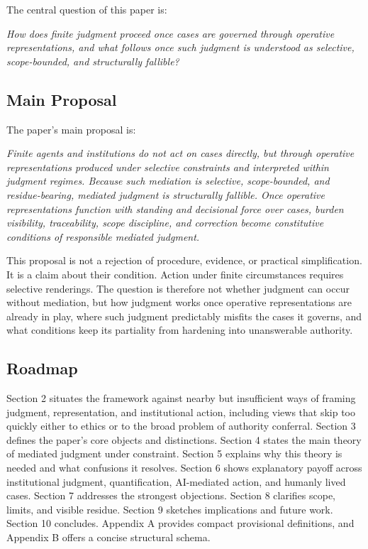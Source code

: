\documentclass[11pt]{article}
\renewenvironment{quote}
  {\list{}{\leftmargin=1.4em \rightmargin=1.0em}%
   \item\relax\color{softink}\itshape}
  {\endlist}
\begin{document}
The central question of this paper is:

\begin{quote}
How does finite judgment proceed once cases are governed through operative representations, and what follows once such judgment is understood as selective, scope-bounded, and structurally fallible?
\end{quote}

\subsection{Main Proposal}

The paper's main proposal is:

\begin{quote}
Finite agents and institutions do not act on cases directly, but through operative representations produced under selective constraints and interpreted within judgment regimes. Because such mediation is selective, scope-bounded, and residue-bearing, mediated judgment is structurally fallible. Once operative representations function with standing and decisional force over cases, burden visibility, traceability, scope discipline, and correction become constitutive conditions of responsible mediated judgment.
\end{quote}

This proposal is not a rejection of procedure, evidence, or practical simplification. It is a claim about their condition. Action under finite circumstances requires selective renderings. The question is therefore not whether judgment can occur without mediation, but how judgment works once operative representations are already in play, where such judgment predictably misfits the cases it governs, and what conditions keep its partiality from hardening into unanswerable authority.

\subsection{Roadmap}

Section 2 situates the framework against nearby but insufficient ways of framing judgment, representation, and institutional action, including views that skip too quickly either to ethics or to the broad problem of authority conferral. Section 3 defines the paper's core objects and distinctions. Section 4 states the main theory of mediated judgment under constraint. Section 5 explains why this theory is needed and what confusions it resolves. Section 6 shows explanatory payoff across institutional judgment, quantification, AI-mediated action, and humanly lived cases. Section 7 addresses the strongest objections. Section 8 clarifies scope, limits, and visible residue. Section 9 sketches implications and future work. Section 10 concludes. Appendix A provides compact provisional definitions, and Appendix B offers a concise structural schema.
\end{document}
